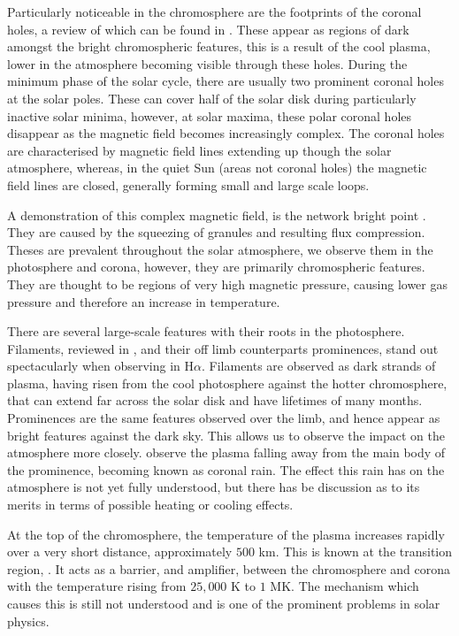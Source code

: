 Particularly noticeable in the chromosphere are the footprints of the coronal holes, a review of which can be found in \cite{Cranmer2009}.
These appear as regions of dark amongst the bright chromospheric features, this is a result of the cool plasma, lower in the atmosphere becoming visible through these holes.
During the minimum phase of the solar cycle, there are usually two prominent coronal holes at the solar poles. 
These can cover half of the solar disk during particularly inactive solar minima, however, at solar maxima, these polar coronal holes disappear as the magnetic field becomes increasingly complex.
The coronal holes are characterised by magnetic field lines extending up though the solar atmosphere, whereas, in the quiet Sun (areas not coronal holes) the magnetic field lines are closed, generally forming small and large scale loops.

A demonstration of this complex magnetic field, is the network bright point \cite{Muller1992}.
They are caused by the squeezing of granules and resulting flux compression.
Theses are prevalent throughout the solar atmosphere, we observe them in the photosphere and corona, however, they are primarily chromospheric features.
They are thought to be regions of very high magnetic pressure, causing lower gas pressure and therefore an increase in temperature.

There are several large-scale features with their roots in the photosphere.
Filaments, reviewed in \cite{Engvold2004}, and their off limb counterparts prominences, stand out spectacularly when observing in H$\alpha$.
Filaments are observed as dark strands of plasma, having risen from the cool photosphere against the hotter chromosphere, that can extend far across the solar disk and have lifetimes of many months.
Prominences are the same features observed over the limb, and hence appear as bright features against the dark sky.
This allows us to observe the impact on the atmosphere more closely. 
\cite{Kawaguchi1970} observe the plasma falling away from the main body of the prominence, becoming known as coronal rain.
The effect this rain has on the atmosphere is not yet fully understood, but there has be discussion as to its merits in terms of possible heating or cooling effects.

At the top of the chromosphere, the temperature of the plasma increases rapidly over a very short distance, approximately $500$ km. 
This is known at the transition region, \cite{Mariska1986}.
It acts as a barrier, and amplifier, between the chromosphere and corona with the temperature rising from $25,000$ K to $1$ MK. The mechanism which causes this is still not understood and is one of the prominent problems in solar physics.


